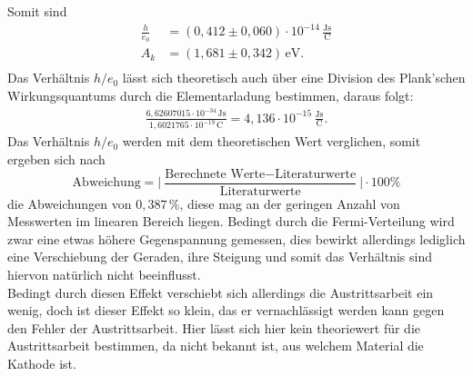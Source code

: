  \noindent
 Somit sind
 \begin{align*}
  \frac{h}{e_0} &=(0,412\pm 0,060)\cdot \mathrm{10^{-14}\,\frac{Js}{C}} \\
  A_k &=( 1,681 \pm 0,342 )\,\mathrm{eV} .\\
 \end{align*}
 \noindent
 Das Verhältnis $h/e_0$ lässt sich theoretisch auch über eine Division des Plank'schen Wirkungsquantums \cite{2} durch die Elementarladung \cite{3} bestimmen, daraus folgt:
\begin{eqnarray}
\nonumber
\frac{6,62607015 \cdot 10^{-34} \, \text{Js}}{1,6021765\cdot 10^{-19} \, \text{C}} =  4,136 \cdot 10^{-15}   \, \mathrm{\frac{Js}{C}}.
\end{eqnarray}
Das Verhältnis $h/e_0$  werden  mit dem theoretischen Wert verglichen, somit ergeben sich nach  
\begin{equation}
  \nonumber
  \text{Abweichung} = \Big\vert\frac{\text{Berechnete Werte}-\text{Literaturwerte}}{\text{Literaturwerte}}\Big\vert \cdot 100 \%
\end{equation}
die Abweichungen von  $ 0,387 \, \% $,
 diese mag an der geringen Anzahl von Messwerten im linearen Bereich liegen. 
 Bedingt durch die Fermi-Verteilung wird zwar eine etwas höhere Gegenspannung gemessen, 
 dies bewirkt allerdings lediglich eine Verschiebung der Geraden, ihre Steigung und somit das Verhältnis 
 sind hiervon natürlich nicht beeinflusst.\\
  Bedingt durch diesen Effekt verschiebt sich allerdings
  die Austrittsarbeit ein wenig, doch ist dieser Effekt so klein, das er vernachlässigt werden 
  kann gegen den Fehler der Austrittsarbeit. Hier lässt sich hier kein theoriewert  für die Austrittsarbeit bestimmen,
  da nicht bekannt ist, aus welchem Material die Kathode ist.


